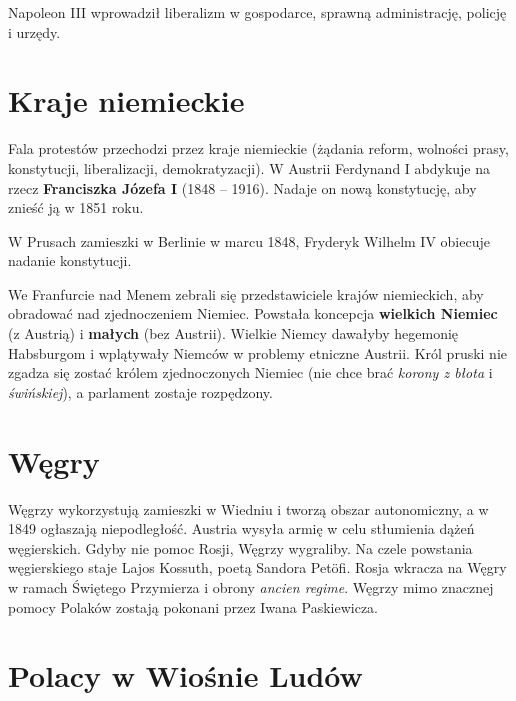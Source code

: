 \documentclass [a4paper, 11pt, oneside]{book}
\begin{document}
            Napoleon III wprowadził liberalizm w gospodarce, sprawną administrację, policję i urzędy.
    \section{Kraje niemieckie} %
    \label{sec:kraje_niemieckie}
        Fala protestów przechodzi przez kraje niemieckie (żądania reform, wolności prasy, konstytucji, liberalizacji, demokratyzacji). W Austrii Ferdynand I abdykuje na rzecz \textbf{Franciszka Józefa I} (1848 -- 1916). Nadaje on nową konstytucję, aby znieść ją w 1851 roku.

        W Prusach zamieszki w Berlinie w marcu 1848, Fryderyk Wilhelm IV obiecuje nadanie konstytucji.

        We Franfurcie nad Menem zebrali się przedstawiciele krajów niemieckich, aby obradować nad zjednoczeniem Niemiec. Powstała koncepcja \textbf{wielkich Niemiec} (z Austrią) i \textbf{małych} (bez Austrii). Wielkie Niemcy dawałyby hegemonię Habsburgom i wplątywały Niemców w problemy etniczne Austrii. Król pruski nie zgadza się zostać królem zjednoczonych Niemiec (nie chce brać \emph{korony z błota} i \emph{świńskiej}), a parlament zostaje rozpędzony.
    \section{Węgry} %
    \label{sec:w_gry}
        Węgrzy wykorzystują zamieszki w Wiedniu i tworzą obszar autonomiczny, a w 1849 ogłaszają niepodległość. Austria wysyła armię w celu stłumienia dążeń węgierskich. Gdyby nie pomoc Rosji, Węgrzy wygraliby. Na czele powstania węgierskiego staje Lajos Kossuth, poetą Sandora Pet\"{o}fi. Rosja wkracza na Węgry w ramach Świętego Przymierza i obrony \emph{ancien regime}. Węgrzy mimo znacznej pomocy Polaków zostają pokonani przez Iwana Paskiewicza.
    \section{Polacy w Wiośnie Ludów} %
    \label{sec:polacy_w_wio_nie_lud_w}
\end{document}
